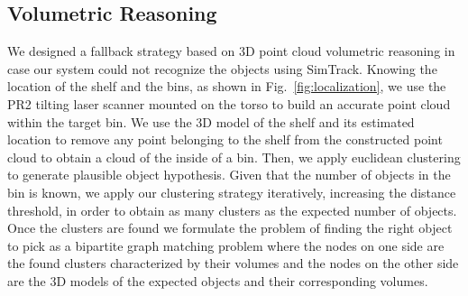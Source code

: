 \subsection{Volumetric Reasoning}

We designed a fallback strategy based on 3D point cloud volumetric reasoning in case our system could not recognize the objects using SimTrack. Knowing the location of the shelf and the bins, as shown in Fig.~\ref{fig:localization}, we use the PR2 tilting laser scanner mounted on the torso to build an accurate point cloud within the target bin. We use the 3D model of the shelf and its estimated location to remove any point belonging to the shelf from the constructed point cloud to obtain a cloud of the inside of a bin. Then, we  apply euclidean clustering to generate plausible object hypothesis. Given that the number of objects in the bin is known, we apply our clustering strategy iteratively, increasing the distance threshold, in order to obtain as many clusters as the expected number of objects. Once the clusters are found we formulate the problem of finding the right object to pick as a bipartite graph matching problem where the nodes on one side are the found clusters characterized by their volumes and the nodes on the other side are the 3D models of the expected objects and their corresponding volumes.